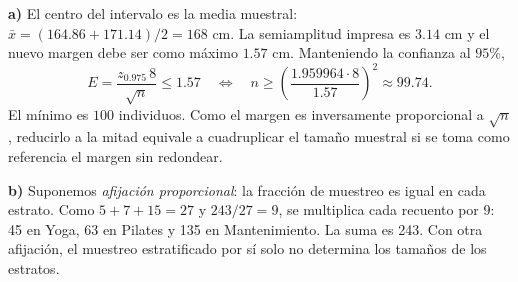 \textbf{a)} El centro del intervalo es la media muestral:
$\bar x=(164.86+171.14)/2=\boxed{168\text{ cm}}$.
La semiamplitud impresa es $3.14$ cm y el nuevo margen debe ser
como máximo $1.57$ cm. Manteniendo la confianza al $95\%$,
\[
E=\frac{z_{0.975}\,8}{\sqrt n}\le1.57
\quad\Longleftrightarrow\quad
n\ge\left(\frac{1.959964\cdot8}{1.57}\right)^2\approx99.74.
\]
El mínimo es $\boxed{100}$ individuos. Como el margen es inversamente
proporcional a $\sqrt n$, reducirlo a la mitad equivale a cuadruplicar
el tamaño muestral si se toma como referencia el margen sin redondear.

\textbf{b)} Suponemos \emph{afijación proporcional}: la fracción
de muestreo es igual en cada estrato. Como $5+7+15=27$ y
$243/27=9$, se multiplica cada recuento por 9:
45 en Yoga, 63 en Pilates y 135 en Mantenimiento.
La suma es 243. Con otra afijación, el muestreo estratificado por sí
solo no determina los tamaños de los estratos.

